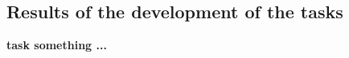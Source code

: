 
\subsection{Results of the development of the tasks}
\textbf{task something ...}




%
%
%
%
%
%
%
%

